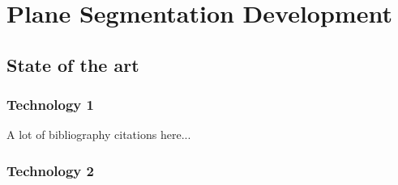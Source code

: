 
\chapter{Plane Segmentation Development} \label{chap:plane-segmentation-development}

\section{State of the art}

\subsection{Technology 1}

A lot of bibliography citations here...

\bt

\subsection{Technology 2}

\bt

